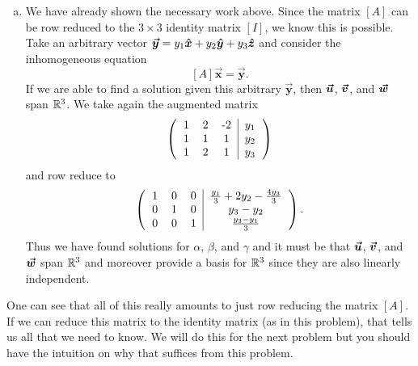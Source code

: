 \documentclass[12pt]{article} %
\newcommand{\vecx}{\boldsymbol{\vec{x}}}
\newcommand{\vecy}{\boldsymbol{\vec{y}}}
\begin{document}
\begin{solution}
\begin{enumerate}[(a)]
        \item We have already shown the necessary work above.  Since the matrix $[A]$ can be row reduced to the $3\times 3$ identity matrix $[I]$, we know this is possible.  Take an arbitrary vector $\vecy = y_1 \xhat + y_2\yhat + y_3\zhat$ and consider the inhomogeneous equation
        \[
        [A]\vecx = \vecy.
        \]
        If we are able to find a solution given this arbitrary $\vecy$, then $\boldsymbol{\boldsymbol{\vec{u}}}$, $\boldsymbol{\boldsymbol{\vec{v}}}$, and $\boldsymbol{\boldsymbol{\vec{w}}}$ span $\mathbb{R}^3$.  We take again the augmented matrix
        \[
        \left( \begin{tabular}{ccc|c} 1 & 2 & -2 & $y_1$ \\ 1 & 1 & 1 & $y_2$ \\ 1 & 2 & 1 & $y_3$ \end{tabular} \right)
        \]
        and row reduce to
        \[
\left( \begin{tabular}{ccc|c} 1 & 0 & 0 & $\frac{y_1}{3} + 2y_2 - \frac{4y_3}{3}$ \\ 0 & 1 & 0 & $y_3 - y_2$\\ 0 & 0 & 1 & $\frac{y_3 -y_1}{3}$ \end{tabular} \right).
        \]
        Thus we have found solutions for $\alpha$, $\beta$, and $\gamma$ and it must be that $\boldsymbol{\boldsymbol{\vec{u}}}$, $\boldsymbol{\boldsymbol{\vec{v}}}$, and $\boldsymbol{\boldsymbol{\vec{w}}}$ span $\mathbb{R}^3$ and moreover provide a basis for $\mathbb{R}^3$ since they are also linearly independent.  
    \end{enumerate}
\begin{remark}
    One can see that all of this really amounts to just row reducing the matrix $[A]$.  If we can reduce this matrix to the identity matrix (as in this problem), that tells us all that we need to know.  We will do this for the next problem but you should have the intuition on why that suffices from this problem.
\end{remark}
\end{solution}
\end{document}
